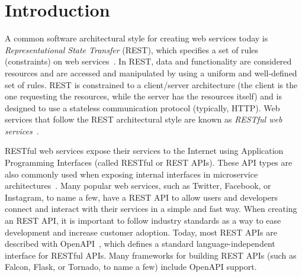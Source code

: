 \section{Introduction}
\label{sec:introduction}

A common software architectural style for creating web services today is {\em Representational State Transfer} (REST), which specifies a set of rules (constraints) on web services~\cite{fielding2000architectural}. In REST, data and functionality are considered resources and are accessed and manipulated by using a uniform and well-defined set of rules.
%
REST is constrained to a client/server architecture (the client is the one requesting the resources, while the server has the resources itself) and is designed to use a stateless communication protocol (typically, HTTP). 
 Web services that follow the REST architectural style are known as {\em RESTful web services}~\cite{RESTful-WS-book-07}.

RESTful web services expose their services to the Internet using Application Programming Interfaces (called RESTful or REST APIs). These API types are also commonly used when exposing internal interfaces in microservice architectures~\cite{madden2020api}. Many popular web services, such as Twitter, Facebook, or Instagram, to name a few, have a REST API to allow users and developers connect and interact with their services in a simple and fast way. 
% 
When creating an REST API, it is important to follow industry standards as a way to ease development and increase customer adoption. Today, most REST APIs are described with OpenAPI~\cite{OpenAPISpecification}, which defines a standard language-independent interface for RESTful APIs. Many frameworks for building REST APIs (such as Falcon, Flask, or Tornado, to name a few) include OpenAPI support. 

